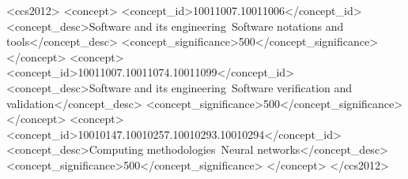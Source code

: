 \documentclass[sigconf]{acmart}
\begin{document}
\begin{CCSXML}
<ccs2012>
<concept>
<concept_id>10011007.10011006</concept_id>
<concept_desc>Software and its engineering~Software notations and tools</concept_desc>
<concept_significance>500</concept_significance>
</concept>
<concept>
<concept_id>10011007.10011074.10011099</concept_id>
<concept_desc>Software and its engineering~Software verification and validation</concept_desc>
<concept_significance>500</concept_significance>
</concept>
<concept>
<concept_id>10010147.10010257.10010293.10010294</concept_id>
<concept_desc>Computing methodologies~Neural networks</concept_desc>
<concept_significance>500</concept_significance>
</concept>
</ccs2012>
\end{CCSXML}




\maketitle
\end{document}
